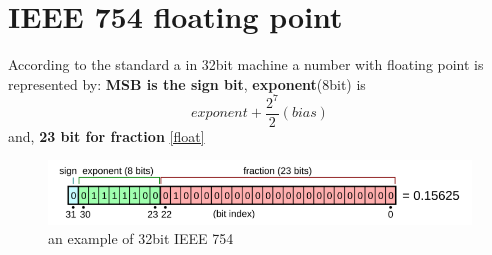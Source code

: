 \section{IEEE 754 floating point}
According to the standard a in 32bit machine a number with floating point is represented by:\textbf{ MSB is the sign bit}, \textbf{exponent}(8bit) is\[exponent +  \frac{2^{7}}{2}(bias)\] and, \textbf{23 bit for fraction} \autoref{float}
\begin{figure}[b!]
	\includegraphics{float.png}
	\caption{an example of 32bit IEEE 754}
	\label{float}
\end{figure}


